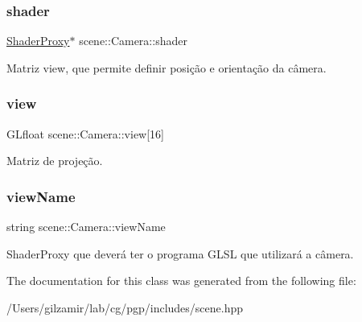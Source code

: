 \subsubsection{\texorpdfstring{shader}{shader}}
{\footnotesize\ttfamily \mbox{\hyperlink{classshaderutils_1_1_shader_proxy}{Shader\+Proxy}}$\ast$ scene\+::\+Camera\+::shader}

Matriz view, que permite definir posição e orientação da câmera. \mbox{\label{classscene_1_1_camera_af52b73ac5111d33233f1644ac9968bfa}} 
\subsubsection{\texorpdfstring{view}{view}}
{\footnotesize\ttfamily G\+Lfloat scene\+::\+Camera\+::view\mbox{[}16\mbox{]}}

Matriz de projeção. \mbox{\label{classscene_1_1_camera_a5487802433bfc79bd974e01c2067b6f2}} 
\subsubsection{\texorpdfstring{view\+Name}{viewName}}
{\footnotesize\ttfamily string scene\+::\+Camera\+::view\+Name}

Shader\+Proxy que deverá ter o programa G\+L\+SL que utilizará a câmera. 

The documentation for this class was generated from the following file\+:\begin{DoxyCompactItemize}
\item 
/\+Users/gilzamir/lab/cg/pgp/includes/scene.\+hpp\end{DoxyCompactItemize}
